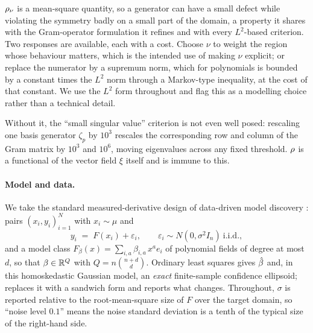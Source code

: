 \begin{remark}
$\rho_\nu$ is a mean-square quantity, so a generator can have a small defect
while violating the symmetry badly on a small part of the domain, a property it shares with the Gram-operator formulation it refines and with every $L^2$-based criterion. Two responses are available, each with a cost. Choose
$\nu$ to weight the region whose behaviour matters, which is the intended use of
making $\nu$ explicit; or replace the numerator by a supremum norm, which for
polynomials is bounded by a constant times the $L^2$ norm through a Markov-type
inequality, at the cost of that constant. We use the $L^2$ form throughout and
flag this as a modelling choice rather than a technical detail.
\end{remark}

\begin{remark}
Without it, the ``small singular value'' criterion is not even well posed:
rescaling one basis generator $\zeta_p$ by $10^{3}$ rescales the corresponding
row and column of the Gram matrix by $10^{3}$ and $10^{6}$, moving eigenvalues
across any fixed threshold. $\rho$ is a functional of the vector field $\xi$
itself and is immune to this.
\end{remark}

\paragraph{Model and data.} We take the standard measured-derivative design of
data-driven model discovery \citep{brunton2016discovering}: pairs
$(x_i, y_i)_{i=1}^N$ with $x_i \sim \mu$ and
\begin{equation}
  y_i \;=\; F(x_i) + \varepsilon_i , \qquad \varepsilon_i \sim N(0, \sigma^2 I_n)
  \ \text{i.i.d.},
  \label{eq:model}
\end{equation}
and a model class $F_\beta(x) = \sum_{i,a} \beta_{i,a}\, x^{a} e_i$ of
polynomial fields of degree at most $d$, so that $\beta \in \mathbb{R}^Q$ with
$Q = n\binom{n+d}{d}$. Ordinary least squares gives $\hat{\beta}$ and, in this
homoskedastic Gaussian model, an \emph{exact} finite-sample confidence
ellipsoid;  replaces it with a sandwich form and reports
what changes. Throughout, $\sigma$ is reported relative to the
root-mean-square size of $F$ over the target domain, so ``noise level $0.1$''
means the noise standard deviation is a tenth of the typical size of the
right-hand side.

